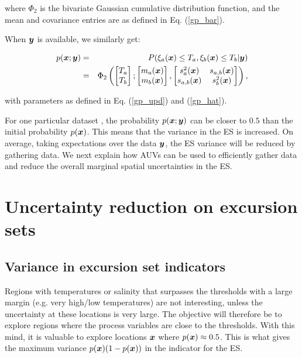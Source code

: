 \documentclass[aoas]{imsart}
\newcommand{\kcomment}[1]{{\color{blue}{\{KR: #1\}}}}
\begin{document}
where $\Phi_2$ is the bivariate Gaussian cumulative distribution
function, and the mean and covariance entries are as defined in Eq.
(\ref{gp_bar}).

When ${\boldsymbol y}$ is available, we similarly get:

\begin{eqnarray}\label{eq:prob_mv}
 p(\bx;\by) &=& P(\xi_a(\bx) \leq T_a, \xi_b(\bx) \leq T_b |\by) 
 \nonumber \\
 &=& \Phi_2 \begin{pmatrix} 
\begin{bmatrix} T_a\\
T_b
\end{bmatrix};
\begin{bmatrix} m_{a}(\bx)\\
m_{b}(\bx)
\end{bmatrix},\begin{bmatrix}
s_{a}^2(\bx) & s_{a,b}(\bx)  \\
s_{a,b}(\bx)  & s_{b}^2(\bx)  
\end{bmatrix}\end{pmatrix},
\end{eqnarray}

with parameters as defined in Eq. (\ref{gp_upd}) and (\ref{gp_hat}).

For one particular dataset \kcomment{This is unclear, rephrase}, the
probability $p({\boldsymbol x};{\boldsymbol y})$ can be closer to $0.5$ than the initial
probability $p({\boldsymbol x})$. This means that the variance in the ES is
increased. On average, taking expectations over the data ${\boldsymbol y}$, the ES
variance will be reduced by gathering data. We next explain how AUVs
can be used to efficiently gather data and reduce the overall marginal
spatial uncertainties in the ES.

\section{Uncertainty reduction on excursion sets}\label{sec:sur}

\subsection{Variance in excursion set indicators}

Regions with temperatures or salinity that surpasses the thresholds with a large margin (e.g. very high/low temperatures) are not interesting, unless the uncertainty at these locations is very large. The objective will therefore be to explore regions where the process variables are close to the thresholds. With this mind, it is valuable to explore locations ${\boldsymbol x}$ where $p({\boldsymbol x}) \approx 0.5$. This is what gives the maximum variance $p({\boldsymbol x}) (1-p({\boldsymbol x}))$ in the indicator for the ES. 
\end{document}
